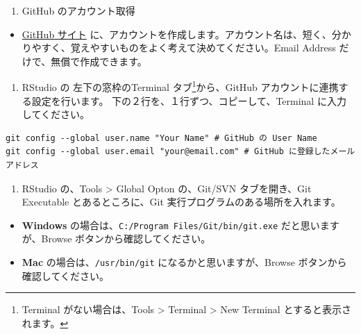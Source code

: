 \documentclass[
]{bxjsbook}
\providecommand{\tightlist}{%
  \setlength{\itemsep}{0pt}\setlength{\parskip}{0pt}}
\theoremstyle{definition}
\theoremstyle{definition}
\theoremstyle{definition}
\theoremstyle{definition}
\theoremstyle{remark}
\begin{document}
\begin{enumerate}
\def\labelenumi{\arabic{enumi}.}
\setcounter{enumi}{1}
\tightlist
\item
  GitHub のアカウント取得
\end{enumerate}

\begin{itemize}
\tightlist
\item
  \href{https://github.com}{GitHub サイト} に、アカウントを作成します。アカウント名は、短く、分かりやすく、覚えやすいものをよく考えて決めてください。Email Address だけで、無償で作成できます。
\end{itemize}

\begin{enumerate}
\def\labelenumi{\arabic{enumi}.}
\setcounter{enumi}{2}
\tightlist
\item
  RStudio の 左下の窓枠のTerminal タブ\footnote{Terminal がない場合は、Tools \textgreater{} Terminal \textgreater{} New Terminal とすると表示されます。}から、GitHub アカウントに連携する設定を行います。
  下の２行を、１行ずつ、コピーして、Terminal に入力してください。
\end{enumerate}

\begin{verbatim}
git config --global user.name "Your Name" # GitHub の User Name
git config --global user.email "your@email.com" # GitHub に登録したメールアドレス
\end{verbatim}

\begin{enumerate}
\def\labelenumi{\arabic{enumi}.}
\setcounter{enumi}{3}
\tightlist
\item
  RStudio の、Tools \textgreater{} Global Opton の、Git/SVN タブを開き、Git Executable とあるところに、Git 実行プログラムのある場所を入れます。
\end{enumerate}

\begin{itemize}
\tightlist
\item
  \textbf{Windows} の場合は、\texttt{C:/Program\ Files/Git/bin/git.exe} だと思いますが、Browse ボタンから確認してください。
\item
  \textbf{Mac} の場合は、\texttt{/usr/bin/git} になるかと思いますが、Browse ボタンから確認してください。
\end{itemize}
\end{document}
